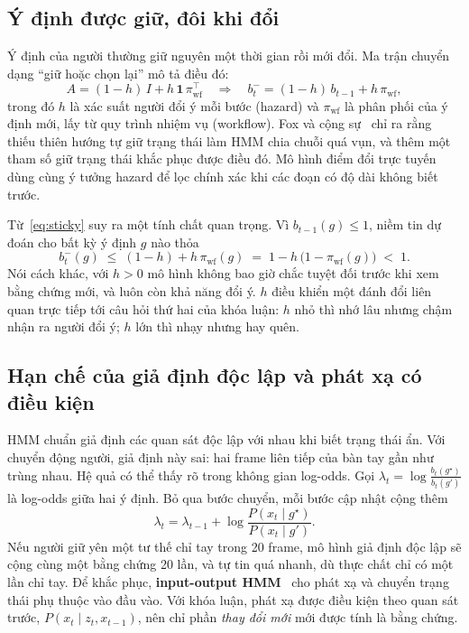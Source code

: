 \subsection{Ý định được giữ, đôi khi đổi}

Ý định của người thường giữ nguyên một thời gian rồi mới đổi. Ma trận chuyển dạng ``giữ hoặc chọn lại'' mô tả điều đó:
\begin{equation}
  A=(1-h)\,I+h\,\mathbf{1}\,\pi_{\text{wf}}^\top
  \quad\Rightarrow\quad
  b^-_t=(1-h)\,b_{t-1}+h\,\pi_{\text{wf}},
  \label{eq:sticky}
\end{equation}
trong đó $h$ là xác suất người đổi ý mỗi bước (hazard) và $\pi_{\text{wf}}$ là phân phối của ý định mới, lấy từ quy trình nhiệm vụ (workflow). Fox và cộng sự~\cite{fox2011sticky} chỉ ra rằng thiếu thiên hướng tự giữ trạng thái làm HMM chia chuỗi quá vụn, và thêm một tham số giữ trạng thái khắc phục được điều đó. Mô hình điểm đổi trực tuyến~\cite{fearnhead2007online} dùng cùng ý tưởng hazard để lọc chính xác khi các đoạn có độ dài không biết trước.

Từ~\eqref{eq:sticky} suy ra một tính chất quan trọng. Vì $b_{t-1}(g)\le1$, niềm tin dự đoán cho bất kỳ ý định $g$ nào thỏa
\begin{equation}
  b^-_t(g)\;\le\;(1-h)+h\,\pi_{\text{wf}}(g)\;=\;1-h\,\big(1-\pi_{\text{wf}}(g)\big)\;<\;1 .
  \label{eq:sticky-ceiling}
\end{equation}
Nói cách khác, với $h>0$ mô hình không bao giờ chắc tuyệt đối trước khi xem bằng chứng mới, và luôn còn khả năng đổi ý. $h$ điều khiển một đánh đổi liên quan trực tiếp tới câu hỏi thứ hai của khóa luận: $h$ nhỏ thì nhớ lâu nhưng chậm nhận ra người đổi ý; $h$ lớn thì nhạy nhưng hay quên.

\subsection{Hạn chế của giả định độc lập và phát xạ có điều kiện}

HMM chuẩn giả định các quan sát độc lập với nhau khi biết trạng thái ẩn. Với chuyển động người, giả định này sai: hai frame liên tiếp của bàn tay gần như trùng nhau. Hệ quả có thể thấy rõ trong không gian log-odds. Gọi $\lambda_t=\log\frac{b_t(g^\star)}{b_t(g')}$ là log-odds giữa hai ý định. Bỏ qua bước chuyển, mỗi bước cập nhật cộng thêm
\begin{equation}
  \lambda_t=\lambda_{t-1}+\log\frac{P(x_t\mid g^\star)}{P(x_t\mid g')}.
  \label{eq:logodds}
\end{equation}
Nếu người giữ yên một tư thế chỉ tay trong 20 frame, mô hình giả định độc lập sẽ cộng cùng một bằng chứng 20 lần, và tự tin quá nhanh, dù thực chất chỉ có một lần chỉ tay. Để khắc phục, \textbf{input-output HMM}~\cite{bengio1995iohmm} cho phát xạ và chuyển trạng thái phụ thuộc vào đầu vào. Với khóa luận, phát xạ được điều kiện theo quan sát trước, $P(x_t\mid z_t,x_{t-1})$, nên chỉ phần \emph{thay đổi mới} mới được tính là bằng chứng.

